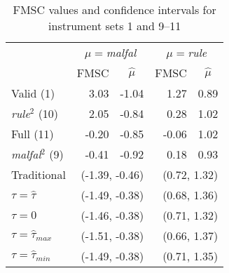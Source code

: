 \begin{table}[htbp]
\caption{FMSC values and confidence intervals for instrument sets 1 and 9--11}
\label{tab:endog}
\small
\centering
 \begin{tabular}{lrrrr}\hline\hline
 & \multicolumn{2}{c}{$\mu=$\emph{malfal}}& \multicolumn{2}{c}{$\mu=$\emph{rule}}\\
&\multicolumn{1}{c}{FMSC}&\multicolumn{1}{c}{$\widehat{\mu}$}&\multicolumn{1}{c}{FMSC}&\multicolumn{1}{c}{$\widehat{\mu}$}\tabularnewline
\hline
Valid (1)& 3.03&-1.04& 1.27&0.89\tabularnewline
\emph{rule}$^2$ (10)& 2.05&-0.84& 0.28&1.02\tabularnewline
Full (11)&-0.20&-0.85& -0.06&1.02\tabularnewline
\emph{malfal}$^2$ (9)&-0.41&-0.92&0.18&0.93\tabularnewline
\hline
Traditional&\multicolumn{2}{r}{(-1.39, -0.46)}&\multicolumn{2}{r}{(0.72, 1.32)}\\
$\tau = \widehat{\tau}$&\multicolumn{2}{r}{(-1.49, -0.38)}&\multicolumn{2}{r}{(0.68, 1.36)}\\
$\tau = 0$&\multicolumn{2}{r}{(-1.46, -0.38)}&\multicolumn{2}{r}{(0.71, 1.32)}\\
$\tau = \widehat{\tau}_{max}$&\multicolumn{2}{r}{(-1.51, -0.38)}&\multicolumn{2}{r}{(0.66, 1.37)}\\
$\tau = \widehat{\tau}_{min}$&\multicolumn{2}{r}{(-1.49, -0.38)}&\multicolumn{2}{r}{(0.71, 1.35)}\\
\hline
\end{tabular}


\footnotesize
\end{table}


